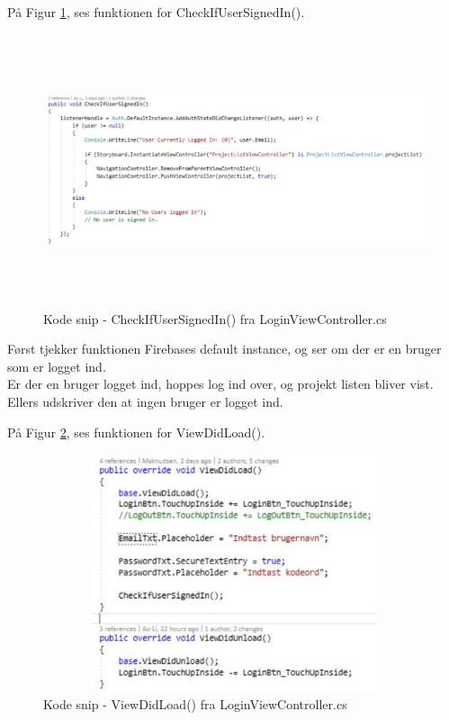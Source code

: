 På Figur \ref{fig:Checkifusersigned}, ses funktionen for CheckIfUserSignedIn().
\begin{figure}[H] %
	\centering
	\includegraphics[height=8cm, width=15cm]{../ArkitekturDesign/Design/Login/Checkifusersigned}
	\caption{Kode snip - CheckIfUserSignedIn() fra LoginViewController.cs}
	\label{fig:Checkifusersigned}
\end{figure}
Først tjekker funktionen Firebases default instance, og ser om der er en bruger som er logget ind. \\
Er der en bruger logget ind, hoppes log ind over, og projekt listen bliver vist. \\
Ellers udskriver den at ingen bruger er logget ind.

På Figur \ref{fig:ViewDidLoadLogin}, ses funktionen for ViewDidLoad().
\begin{figure}[H] %
	\centering
	\includegraphics[height=7cm, width=12cm]{../ArkitekturDesign/Design/Login/ViewDidLoad}
	\caption{Kode snip - ViewDidLoad() fra LoginViewController.cs}
	\label{fig:ViewDidLoadLogin}
\end{figure}

